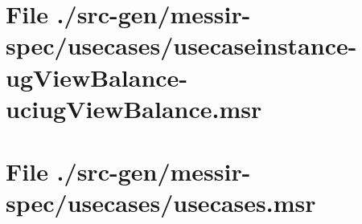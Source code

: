 \section[File /src-gen/messir-spec.../usecaseinstance-ugViewBalance-uciugViewBalance.msr]{File ./src-gen/messir-spec/usecases/usecaseinstance-ugViewBalance-uciugViewBalance.msr}
\scriptsize

\normalsize
	
\section[File /src-gen/messir-spec/usecases/usecases.msr]{File ./src-gen/messir-spec/usecases/usecases.msr}
\scriptsize

\normalsize
	
